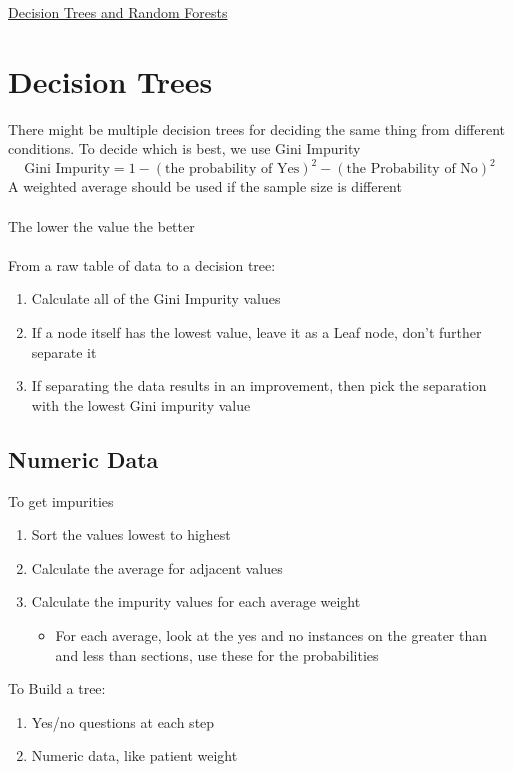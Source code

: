 \documentclass{article}[18pt]
\begin{document}
\begin{center}
\underline{\huge Decision Trees and Random Forests}
\end{center}
\section{Decision Trees}
There might be multiple decision trees for deciding the same thing from different conditions. To decide which is best, we use Gini Impurity
$$\text{Gini Impurity}=1-(\text{the probability of Yes})^2-(\text{the Probability of No})^2$$
A weighted average should be used if the sample size is different\\
\\
The lower the value the better\\
\\
From a raw table of data to a decision tree:
\begin{enumerate}
	\item Calculate all of the Gini Impurity values
	\item If a node itself has the lowest value, leave it as a Leaf node, don't further separate it
	\item If separating the data results in an improvement, then pick the separation with the lowest Gini impurity value
\end{enumerate}
\subsection{Numeric Data}
To get impurities
\begin{enumerate}
	\item Sort the values lowest to highest
	\item Calculate the average for adjacent values
	\item Calculate the impurity values for each average weight
	\begin{itemize}
		\item For each average, look at the yes and no instances on the greater than and less than sections, use these for the probabilities
	\end{itemize}
\end{enumerate}



To Build a tree:
\begin{enumerate}
	\item Yes/no questions at each step
	\item Numeric data, like patient weight
\end{enumerate}
\end{document}
